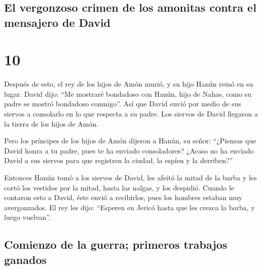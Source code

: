 \hypertarget{el-vergonzoso-crimen-de-los-amonitas-contra-el-mensajero-de-david}{%
\subsection{El vergonzoso crimen de los amonitas contra el mensajero de
David}\label{el-vergonzoso-crimen-de-los-amonitas-contra-el-mensajero-de-david}}

\hypertarget{section-9}{%
\section{10}\label{section-9}}

 Después de esto, el rey de los hijos de Amón murió, y su
hijo Hanún reinó en su lugar.  David dijo: ``Me mostraré
bondadoso con Hanún, hijo de Nahas, como su padre se mostró bondadoso
conmigo''. Así que David envió por medio de sus siervos a consolarlo en
lo que respecta a su padre. Los siervos de David llegaron a la tierra de
los hijos de Amón.

 Pero los príncipes de los hijos de Amón dijeron a Hanún,
su señor: ``¿Piensas que David honra a tu padre, pues te ha enviado
consoladores? ¿Acaso no ha enviado David a sus siervos para que
registren la ciudad, la espíen y la derriben?''

 Entonces Hanún tomó a los siervos de David, les afeitó la
mitad de la barba y les cortó los vestidos por la mitad, hasta las
nalgas, y los despidió.  Cuando le contaron esto a David,
éste envió a recibirlos, pues los hombres estaban muy avergonzados. El
rey les dijo: ``Esperen en Jericó hasta que les crezca la barba, y luego
vuelvan''.

\hypertarget{comienzo-de-la-guerra-primeros-trabajos-ganados}{%
\subsection{Comienzo de la guerra; primeros trabajos
ganados}\label{comienzo-de-la-guerra-primeros-trabajos-ganados}}

